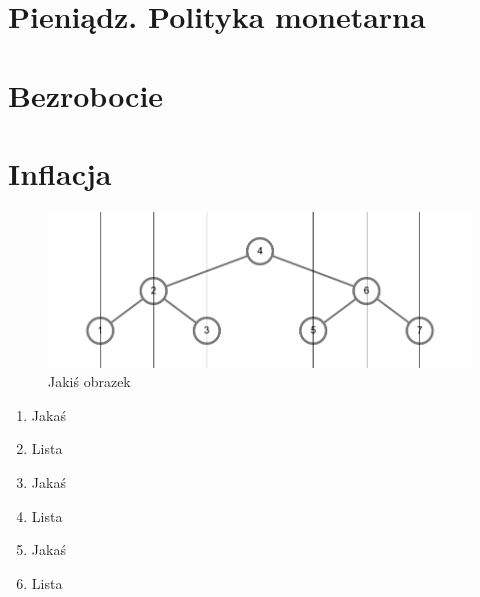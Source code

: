 \documentclass[12pt]{extarticle}
\begin{document}
\section{Pieniądz. Polityka monetarna}
\section{Bezrobocie}
\section{Inflacja}


\begin{figure}[H]
\centering
\includegraphics[width=15cm]{sample}
\caption{Jakiś obrazek}
\end{figure}


\begin{enumerate}
	\item Jakaś
	\item Lista
	\item Jakaś
	\item Lista
	\item Jakaś
	\item Lista
\end{enumerate}

\clearpage\mbox{}\clearpage
\end{document}
